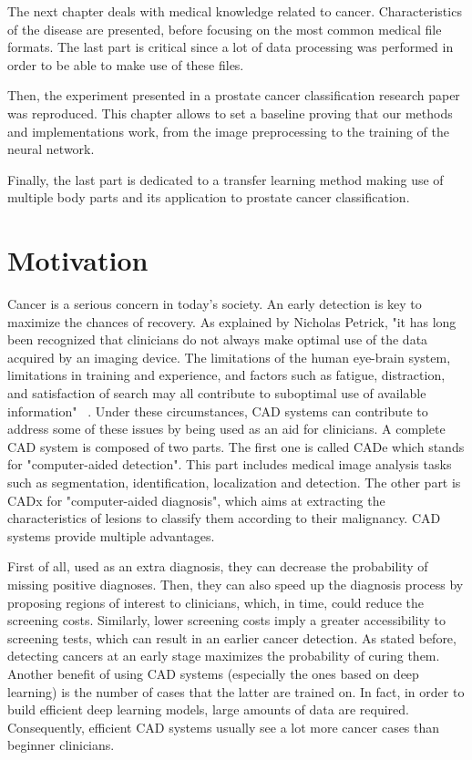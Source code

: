 The next chapter deals with medical knowledge related to cancer. Characteristics of the disease are presented, before focusing on the most common medical file formats. The last part is critical since a lot of data processing was performed in order to be able to make use of these files.

Then, the experiment presented in a prostate cancer classification research paper was reproduced. This chapter allows to set a baseline proving that our methods and implementations work, from the image preprocessing to the training of the neural network.

Finally, the last part is dedicated to a transfer learning method making use of multiple body parts and its application to prostate cancer classification.



\section{Motivation}
\setlength{\marginparwidth}{3cm}\leavevmode {}Cancer is a serious concern in today's society. An early detection is key to maximize the chances of recovery. As explained by Nicholas Petrick, "it has long been recognized that clinicians do not always make optimal use of the data acquired by an imaging device. The limitations of the human eye-brain system, limitations in training and experience, and factors such as fatigue, distraction, and satisfaction of search may all contribute to suboptimal use of available information" ~\cite{50}. Under these circumstances, CAD systems can contribute to address some of these issues by being used as an aid for clinicians. A complete CAD system is composed of two parts. The first one is called CADe which stands for "computer-aided detection". This part includes medical  image  analysis  tasks  such  as  segmentation,  identification,  localization  and  detection. The other part is CADx for "computer-aided diagnosis", which aims at extracting the characteristics of lesions to classify them according to their malignancy. CAD systems provide multiple advantages.

First of all, used as an extra diagnosis, they can decrease the probability of missing positive diagnoses. Then, they can also speed up the diagnosis process by proposing regions of interest to clinicians, which, in time, could reduce the screening costs. Similarly, lower screening costs imply a greater accessibility to screening tests, which can result in an earlier cancer detection. As stated before, detecting cancers at an early stage maximizes the probability of curing them. Another benefit of using CAD systems (especially the ones based on deep learning) is the number of cases that the latter are trained on. In fact, in order to build efficient deep learning models, large amounts of data are required. Consequently, efficient CAD systems usually see a lot more cancer cases than beginner clinicians.

